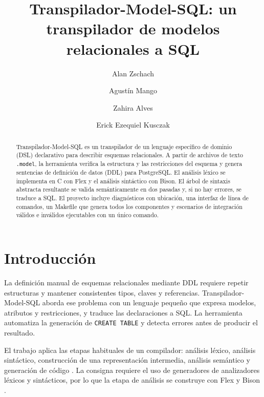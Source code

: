 \documentclass[runningheads]{llncs}
\begin{document}
\title{Transpilador-Model-SQL: un transpilador de modelos relacionales a SQL}
\author{Alan Zschach \and Agustín Mango \and
Zahira Alves \and Erick Ezequiel Kusczak}
\maketitle

\begin{abstract}
Transpilador-Model-SQL es un transpilador de un lenguaje específico de dominio (DSL) declarativo
para describir esquemas relacionales. A partir de archivos de texto \texttt{.model},
la herramienta verifica la estructura y las restricciones del esquema y genera
sentencias de definición de datos (DDL) para PostgreSQL. El análisis léxico se
implementa en C con Flex y el análisis sintáctico con Bison. El árbol de sintaxis
abstracta resultante se valida semánticamente en dos pasadas y, si no hay errores,
se traduce a SQL. El proyecto incluye diagnósticos con ubicación, una interfaz de
línea de comandos, un Makefile que genera todos los componentes y escenarios de
integración válidos e inválidos ejecutables con un único comando.

\end{abstract}

\section{Introducción}

La definición manual de esquemas relacionales mediante DDL requiere repetir
estructuras y mantener consistentes tipos, claves y referencias. Transpilador-Model-SQL aborda
ese problema con un lenguaje pequeño que expresa modelos, atributos y restricciones,
y traduce las declaraciones a SQL. La herramienta automatiza la generación de
\texttt{CREATE TABLE} y detecta errores antes de producir el resultado.

El trabajo aplica las etapas habituales de un compilador: análisis léxico,
análisis sintáctico, construcción de una representación intermedia, análisis
semántico y generación de código \cite{aho}. La consigna requiere el uso de
generadores de analizadores léxicos y sintácticos, por lo que la etapa de análisis
se construye con Flex y Bison \cite{flex,bison}.
\end{document}
